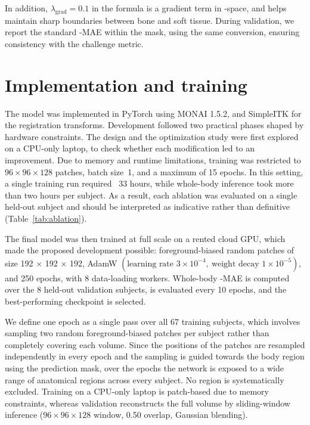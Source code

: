 \documentclass{article}
\begin{document}
In addition, $\lambda_{\text{grad}}=0.1$ in the formula is a gradient term in \textmu-space, and helps maintain sharp boundaries between bone and soft tissue.
During validation, we report the standard \textmu-MAE within the mask, using the same conversion, ensuring consistency with the challenge metric.

\section{Implementation and training}

The model was implemented in PyTorch using MONAI 1.5.2, and SimpleITK for the registration transforms. 
Development followed two practical phases shaped by hardware constraints. The design and the optimization study were first explored on a CPU-only laptop, to check whether each modification led to an improvement. 
Due to memory and runtime limitations, training was restricted to $96\times96\times128$ patches, batch size~1, and a maximum of 15 epochs. In this setting, a single training run required ~33 hours, while whole-body inference took more than two hours per subject. As a result, each ablation was evaluated on a single held-out subject and should be interpreted as indicative rather than definitive (Table~\ref{tab:ablation}).

The final model was then trained at full scale on a rented cloud GPU, which made the proposed development possible: foreground-biased random patches of size 192 × 192 × 192, AdamW $(\text{learning rate } 3 \times 10^{-4},\ \text{weight decay } 1 \times 10^{-5})$, and 250 epochs, with 8 data-loading workers. Whole-body \textmu-MAE is computed over the 8 held-out validation subjects, is evaluated every 10 epochs, and the best-performing checkpoint is selected.

We define one epoch as a single pass over all 67 training subjects, which involves sampling two random foreground-biased patches per subject rather than completely covering each volume. 
Since the positions of the patches are resampled independently in every epoch and the sampling is guided towards the body region using the prediction mask, over the epochs the network is exposed to a wide range of anatomical regions across every subject. No region is systematically excluded. 
Training on a CPU-only laptop is patch-based due to memory constraints, whereas validation reconstructs the full volume by sliding-window inference ($96\times96\times128$ window, 0.50 overlap, Gaussian blending). 
\end{document}
